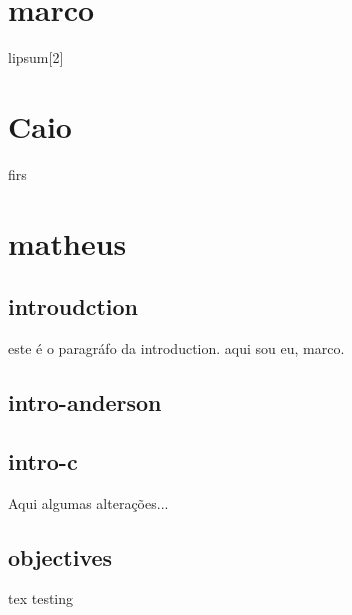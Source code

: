 
    \section{marco}
    lipsum[2]
    \section{Caio}
    firs
    \section{matheus}

    \subsection{introudction}
    este é o paragráfo da introduction.
    aqui sou eu, marco.

    \subsection{intro-anderson}

    \subsection{intro-c}
        Aqui algumas alterações...


    \subsection{objectives}
    tex testing
    



